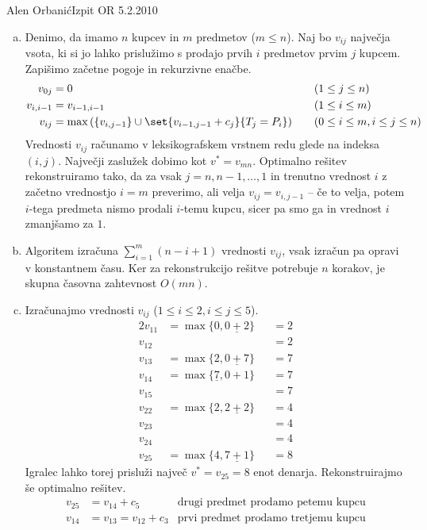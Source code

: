 \begin{naloga}{Alen Orbanić}{Izpit OR 5.2.2010}
\begin{odgovor}
\begin{enumerate}[(a)]
\item Denimo, da imamo $n$ kupcev in $m$ predmetov ($m \le n$).
Naj bo $v_{ij}$ največja vsota,
ki si jo lahko prislužimo s prodajo prvih $i$ predmetov prvim $j$ kupcem.
Zapišimo začetne pogoje in rekurzivne enačbe.
\begin{align*}
v_{0j} &= 0 &&\quad (1 \le j \le n) \\
v_{i,i-1} &= v_{i-1,i-1} &&\quad (1 \le i \le m) \\
v_{ij} &= \max\left(\{v_{i,j-1}\} \cup \set{v_{i-1,j-1} + c_j}{T_j = P_i}\right)
&&\quad (0 \le i \le m, i \le j \le n)
\end{align*}
Vrednosti $v_{ij}$ računamo v leksikografskem vrstnem redu
glede na indeksa $(i, j)$.
Največji zaslužek dobimo kot $v^* = v_{mn}$.
Optimalno rešitev rekonstruiramo tako,
da za vsak $j = n, n-1, \dots, 1$
in trenutno vrednost $i$ z začetno vrednostjo $i = m$ preverimo,
ali velja $v_{ij} = v_{i,j-1}$
-- če to velja, potem $i$-tega predmeta nismo prodali $i$-temu kupcu,
sicer pa smo ga in vrednost $i$ zmanjšamo za $1$.

\item Algoritem izračuna $\sum_{i=1}^m (n-i+1)$ vrednosti $v_{ij}$,
vsak izračun pa opravi v konstantnem času.
Ker za rekonstrukcijo rešitve potrebuje $n$ korakov,
je skupna časovna zahtevnost $O(mn)$.

\item Izračunajmo vrednosti $v_{ij}$ ($1 \le i \le 2, i \le j \le 5$).
\begin{alignat*}{2}
v_{11} &= \max\{0, \underline{0+2}\} &&= 2 \\
v_{12} &&&= 2 \\
v_{13} &= \max\{2, \underline{0+7}\} &&= 7 \\
v_{14} &= \max\{\underline{7}, 0+1\} &&= 7 \\
v_{15} &&&= 7 \\
v_{22} &= \max\{2, \underline{2+2}\} &&= 4 \\
v_{23} &&&= 4 \\
v_{24} &&&= 4 \\
v_{25} &= \max\{4, \underline{7+1}\} &&= 8
\end{alignat*}
Igralec lahko torej prisluži največ $v^* = v_{25} = 8$ enot denarja.
Rekonstruirajmo še optimalno rešitev.
\begin{align*}
v_{25} &= v_{14} + c_5 & \text{drugi predmet prodamo petemu kupcu} \\
v_{14} &= v_{13} = v_{12} + c_3 & \text{prvi predmet prodamo tretjemu kupcu}
\end{align*}
\end{enumerate}
\end{odgovor}
\end{naloga}
